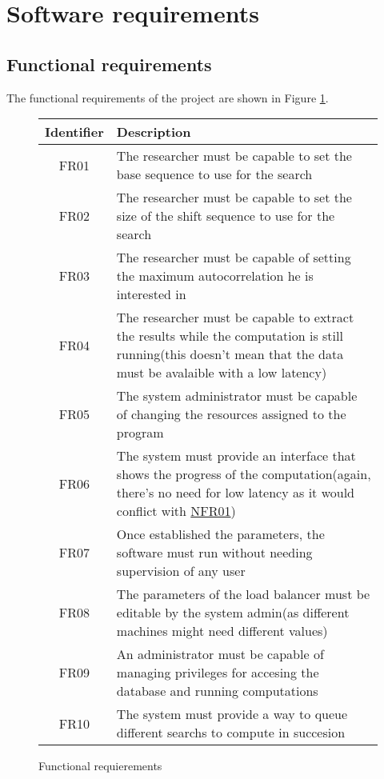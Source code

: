 \section{Software requirements}


\subsection{Functional requirements}

The functional requirements of the project are shown in Figure
\ref{functional:fig}.


\begin{figure}[ht!]

  \begin{center}
    \begin{tabular}{||c | p{12cm}||}
      \hline
      Identifier & Description \\
      \hline
      \hline
      FR01 \label{FR01} & The researcher must be capable to set the base
      sequence to use for the search \\
      \hline
      FR02 \label{FR02} & The researcher must be capable to set the size
      of the shift sequence to use for the search\\
      \hline
      FR03 \label{FR03} & The researcher must be capable of setting the maximum
      autocorrelation he is interested in \\
      \hline
      FR04 \label{FR04} & The researcher must be capable to extract the
      results while the computation is still running(this doesn't mean that
      the data must be avalaible with a low latency)\\
      \hline
      FR05 \label{FR05} & The system administrator must be capable of changing
      the resources assigned to the program\\
      \hline
      FR06 \label{FR06} & The system must provide an interface that shows
      the progress of the computation(again, there's no need for low latency
      as it would conflict with \hyperref[NFR01]{NFR01})\\
      \hline
      FR07 \label{FR07} & Once established the parameters, the software must
      run without needing supervision of any user \\
      \hline
      FR08 \label{FR08} & The parameters of the load balancer must be editable
      by the system admin(as different machines might need different values) \\
      \hline
      FR09 \label{FR09} & An administrator must be capable of managing
      privileges for accesing the database and running computations\\
      \hline
      FR10 \label{FR10} & The system must provide a way to queue different
      searchs to compute in succesion\\
      \hline
    \end{tabular}
  \end{center}

  \caption{Functional requierements}
  \label{functional:fig}
\end{figure}

